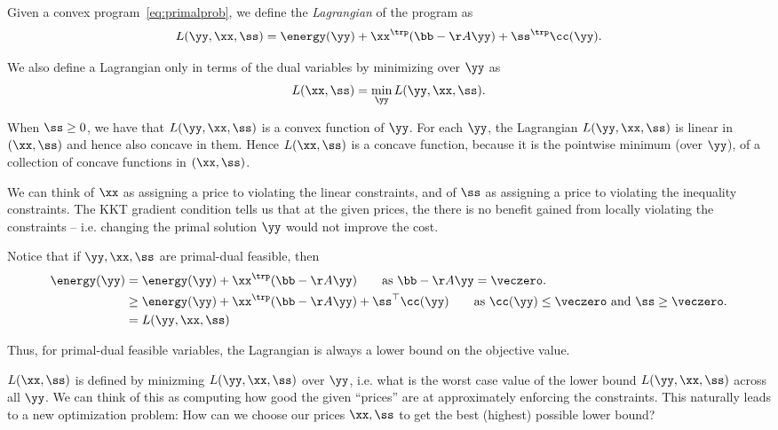 \begin{definition}
Given a convex program~\eqref{eq:primalprob}, we define the
\emph{Lagrangian} of the program as
\begin{equation*} L(\yy, \xx, \ss) = \energy(\yy) +
  \xx^{\trp}(\bb-\AA\yy) + \ss^{\trp}\cc(\yy). \end{equation*}

We also define a Lagrangian only in terms of the dual variables by minimizing over $\yy$ as
\begin{equation*} L(\xx, \ss) = \min_{\yy}L(\yy, \xx,
  \ss). \end{equation*}

\end{definition}
When $\ss \geq 0$, we have that $L(\yy,\xx,\ss)$ is a
convex function of $\yy$.
For each $\yy$, the Lagrangian $L(\yy, \xx,
\ss)$ is linear in $(\xx,\ss)$ and hence also concave in them.
Hence $L(\xx,  \ss)$ is a concave function, because it is the pointwise
minimum (over $\yy$), of a collection of concave functions in
$(\xx,\ss)$.

We can think of $\xx$ as assigning a price to violating the linear
constraints, and of $\ss$ as assigning a price to violating the
inequality constraints.
The KKT gradient condition tells us that at the given prices, the
there is no benefit gained from locally violating the constraints --
i.e. changing the primal solution $\yy$ would not improve the cost.

Notice that if $\yy,\xx,\ss$ are primal-dual feasible, then
\begin{align}
  \energy(\yy)
  &= \energy(\yy) + \xx^{\trp}(\bb-\AA\yy)  \tag*{as
  $\bb-\AA\yy = \veczero$.}\\
    &\geq \energy(\yy) + \xx^{\trp}(\bb-\AA\yy) + \ss^{\top} \cc(\yy)  \tag*{as
      $\cc(\yy) \leq \veczero$ and $\ss \geq \veczero$.}\\
  &= L(\yy,\xx,\ss) \label{eq:weakdual}
\end{align}

Thus, for primal-dual feasible variables, the Lagrangian is always a
lower bound on the objective value.


$L(\xx, \ss)$ is defined by minizming $L(\yy,\xx,\ss)$ over $\yy$,
i.e. what is the worst case value of the lower bound $L(\yy,\xx,\ss)$
across all $\yy$.
We can think of this as computing how good the given ``prices'' are at
approximately enforcing the constraints.
This naturally leads to a new optimization problem: How can we choose
our prices $\xx, \ss$ to get the best (highest) possible lower bound?

